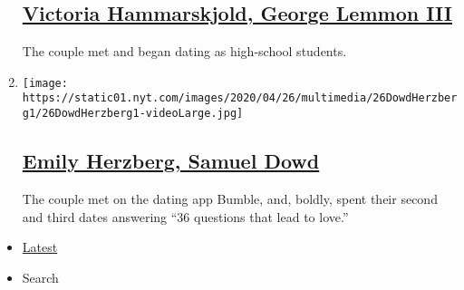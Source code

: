 \begin{enumerate}
  \hypertarget{victoria-hammarskjold-george-lemmon-iii}{%
  \subsection{\texorpdfstring{\href{/2020/05/10/fashion/weddings/victoria-hammarskjold-george-lemmon-iii.html}{Victoria
  Hammarskjold, George Lemmon
  III}}{Victoria Hammarskjold, George Lemmon III}}\label{victoria-hammarskjold-george-lemmon-iii}}

  The couple met and began dating as high-school students.
\item
  \texttt{[image: https://static01.nyt.com/images/2020/04/26/multimedia/26DowdHerzberg1/26DowdHerzberg1-videoLarge.jpg]}

  \hypertarget{emily-herzberg-samuel-dowd}{%
  \subsection{\texorpdfstring{\href{/2020/04/26/fashion/weddings/emily-herzberg-samuel-dowd.html}{Emily
  Herzberg, Samuel
  Dowd}}{Emily Herzberg, Samuel Dowd}}\label{emily-herzberg-samuel-dowd}}

  The couple met on the dating app Bumble, and, boldly, spent their
  second and third dates answering ``36 questions that lead to love.''
\end{enumerate}

\begin{itemize}
\tightlist
\item
  \protect\hyperlink{stream-panel}{Latest}
\item
  Search
\end{itemize}

